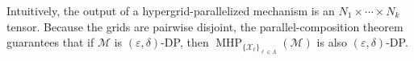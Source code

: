 Intuitively, the output of a hypergrid-parallelized mechanism is an
$N_{1}\times\cdots\times N_{k}$ tensor.  
Because the grids are pairwise disjoint, the parallel-composition theorem guarantees that if $\mathcal{M}$ is $(\varepsilon,\delta)$-DP, then $\operatorname{MHP}_{\{\mathcal{X}_{\boldsymbol{\ell}}\}_{\boldsymbol{\ell}\in\Lambda}}(\mathcal{M})$ is also $(\varepsilon,\delta)$-DP.